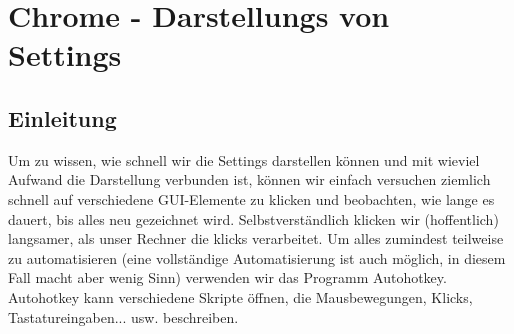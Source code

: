 \documentclass[qualitaetssicherung.tex]{subfiles}
\begin{document}
\section{Chrome - Darstellungs von Settings}
	\subsection{Einleitung}
	Um zu wissen, wie schnell wir die Settings darstellen können und mit wieviel Aufwand die Darstellung verbunden ist, können wir einfach versuchen ziemlich schnell auf verschiedene GUI-Elemente zu klicken und beobachten, wie lange es dauert, bis alles neu gezeichnet wird. Selbstverständlich klicken wir (hoffentlich) langsamer, als unser Rechner die klicks verarbeitet. Um alles zumindest teilweise zu automatisieren (eine vollständige Automatisierung ist auch möglich, in diesem Fall macht aber wenig Sinn) verwenden wir das Programm Autohotkey. Autohotkey kann verschiedene Skripte öffnen, die Mausbewegungen, Klicks, Tastatureingaben... usw. beschreiben.
\end{document}

